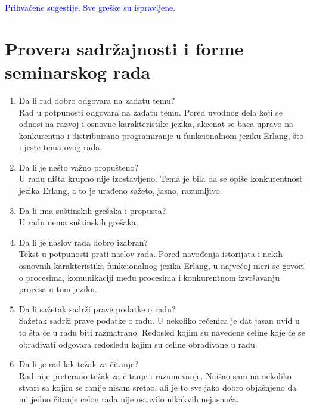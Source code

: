 \documentclass[a4paper]{report}
\newcommand{\odgovor}[1]{\textcolor{blue}{#1}}
\begin{document}
\odgovor{Prihvaćene sugestije. Sve greške su ispravljene.}


\section{Provera sadržajnosti i forme seminarskog rada}

\begin{enumerate}
\item Da li rad dobro odgovara na zadatu temu?\\    
Rad u potpunosti odgovara na zadatu temu. Pored uvodnog dela koji se odnosi na razvoj i osnovne karakteristike jezika, akcenat se baca upravo na konkurentno i distribuirano programiranje u funkcionalnom jeziku Erlang, što i jeste tema ovog rada. 


\item Da li je nešto važno propušteno?\\
U radu ništa krupno nije izostavljeno. Tema je bila da se opiše konkurentnost jezika Erlang, a to je urađeno sažeto, jasno, razumljivo.


\item Da li ima suštinskih grešaka i propusta?\\
U radu nema suštinskih grešaka.


\item Da li je naslov rada dobro izabran?\\
Tekst u potpunosti prati naslov rada. Pored navođenja istorijata i nekih osnovnih karakteristika funkcionalnog jezika Erlang, u najvećoj meri se govori o procesima, komunikaciji među procesima i konkurentnom izvršavanju procesa u tom jeziku.


\item Da li sažetak sadrži prave podatke o radu?\\
Sažetak sadrži prave podatke o radu. U nekoliko rečenica je dat jasan uvid u to šta će u radu biti razmatrano. Redosled kojim su navedene celine koje će se obrađivati odgovara redosledu kojim su celine obrađivane u radu.


\item Da li je rad lak-težak za čitanje?\\
Rad nije preterano težak za čitanje i razumevanje. Naišao sam na nekoliko stvari sa kojim se ranije nisam sretao, ali je to sve jako dobro objašnjeno da mi jedno čitanje celog rada nije ostavilo nikakvih nejasnoća. 




\end{enumerate}
\end{document}
